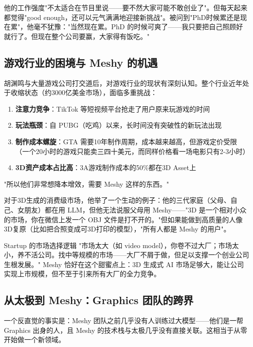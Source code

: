 他的工作强度"不太适合在节目里说——要不然大家可能不敢创业了"。但每天起来都觉得"good enough，还可以元气满满地迎接新挑战"。被问到"PhD时候累还是现在累"，他毫不犹豫："当然现在累。PhD 的时候可爽了——我只要把自己照顾好就行了。但现在整个公司要赢，大家得有饭吃。"

\subsection{游戏行业的困境与 Meshy 的机遇}

胡渊鸣与大量游戏公司打交道后，对游戏行业的现状有深刻认知。整个行业近年处于收缩状态（约3000亿美金市场），面临多重挑战：

\begin{enumerate}
\item \textbf{注意力竞争}：TikTok 等短视频平台抢走了用户原来玩游戏的时间
\item \textbf{玩法瓶颈}：自 PUBG（吃鸡）以来，长时间没有突破性的新玩法出现
\item \textbf{制作成本螺旋}：GTA 需要10年制作周期，成本越来越高，但游戏定价受限（一个20小时的游戏只能卖三四十美元，而同样价格看一场电影只有2-3小时）
\item \textbf{3D资产成本占比高}：3A游戏制作成本的50\%都在3D Asset上
\end{enumerate}

"所以他们非常想降本增效，需要 Meshy 这样的东西。"

对于3D生成的消费级市场，他举了一个生动的例子：他的三代家庭（父母、自己、女朋友）都在用 LLM，但他无法说服父母用 Meshy——"3D 是一个相对小众的市场，你在微信上发一个 OBJ 文件是打不开的。"但如果能做到高质量的人像3D复原（比如把合照变成可3D打印的模型），"所有人都是 Meshy 的用户"。

\begin{knowledgebox}{Startup 的市场选择逻辑}
"市场太大（如 video model），你卷不过大厂；市场太小，养不活公司。找中等规模的市场——大厂不屑于做，但足以支撑一个创业公司生根发展。" Meshy 恰好在这个甜蜜点上：3D 生成式 AI 市场足够大，能让公司实现上市规模，但不至于引来所有大厂的全力竞争。
\end{knowledgebox}

\subsection{从太极到 Meshy：Graphics 团队的跨界}

一个反直觉的事实是：Meshy 团队之前几乎没有人训练过大模型——他们是一帮 Graphics 出身的人，且 Meshy 的技术栈与太极几乎没有直接关联。这相当于从零开始做一个新领域。

